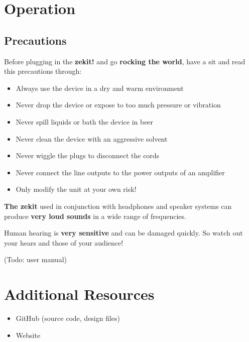 \documentclass{scrartcl}
\begin{document}
\section{Operation}

\subsection{Precautions}
Before plugging in the \textbf{zekit!} and go \textbf{rocking the world}, have a sit and read this precautions through:

\begin{itemize}
    \item Always use the device in a dry and warm environment
    \item Never drop the device or expose to too much pressure or vibration
    \item Never spill liquids or bath the device in beer
    \item Never clean the device with an aggressive solvent
    \item Never wiggle the plugs to disconnect the cords
    \item Never connect the line outputs to the power outputs of an amplifier
    \item Only modify the unit at your own risk!
\end{itemize}

\textbf{The zekit} used in conjunction with headphones and speaker systems can produce \textbf{very loud sounds} in a wide range of frequencies.

Human hearing is \textbf{very sensitive} and can be damaged quickly. So watch out your hears and those of your audience!

(Todo: user manual)


\section{Additional Resources}

\begin{itemize}
    \item GitHub (source code, design files)
    \item Website
\end{itemize}

\pagebreak

\end{document}
